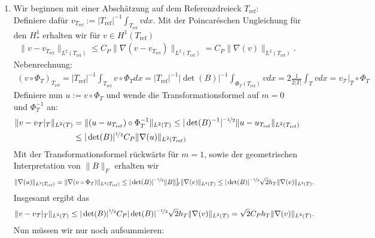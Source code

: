 \begin{solution}
\phantom{}
\begin{enumerate}[label = \textbf{\alph*)}]
  \item Wir beginnen mit einer Abschätzung auf dem Referenzdreieck $T_{\mathrm{ref}}$: \\
  Definiere dafür $v_{T_{\mathrm{ref}}} := |T_{\mathrm{ref}}|^{-1}\int_{T_{\mathrm{ref}}} v dx$.
  Mit der Poincaréschen Ungleichung für den $H_*^1$ erhalten wir für $v \in H^1(T_{\mathrm{ref}})$
  \begin{align*}
    \|v - v_{T_{\mathrm{ref}}}\|_{L^2(T_{\mathrm{ref}})} \leq
    C_P\|\nabla(v- v_{T_{\mathrm{ref}}})\|_{L^2(T_{\mathrm{ref}})}
    = C_P\|\nabla(v)\|_{L^2(T_{\mathrm{ref}})}.
  \end{align*}
  Nebenrechnung:
  \begin{align*}
    (v\circ\Phi_T)_{T_{\mathrm{ref}}} = |T_{\mathrm{ref}}|^{-1}\int_{T_{\mathrm{ref}}} v \circ \Phi_T dx
    = |T_{\mathrm{ref}}|^{-1}|\det(B)|^{-1}\int_{\Phi_T(T_{\mathrm{ref}})} v dx
    = 2 \frac{1}{2|T|}\int_{T} v dx = v_{\mathcal{T}}|_T\circ \Phi_T
  \end{align*}
  Definiere nun $u := v \circ \Phi_T$ und wende die Transformationsformel auf $m = 0$ und $\Phi_T^{-1}$ an:
  \begin{align*}
    \|v - v_{\mathcal{T}}|_T\|_{L^2(T)} &= \|(u - u_{T_{\mathrm{ref}}}) \circ \Phi_T^{-1}\|_{L^2(T)}
    \leq |\det(B)^{-1}|^{\nicefrac{-1}{2}}\|u - u_{T_{\mathrm{ref}}}\|_{L^2(T_{\mathrm{ref}})} \\
    &\leq |\det(B)|^{\nicefrac{1}{2}}C_P\|\nabla(u)\|_{L^2(T_{\mathrm{ref}})}
  \end{align*}
  Mit der Transformationsformel rückwärts für $m = 1$, sowie der geometrischen Interpretation
  von $\|B\|_F$ erhalten wir
  \begin{align*}
    \|\nabla(u)\|_{L^2(T_{\mathrm{ref}})} = \|\nabla(v \circ \Phi_T)\|_{L^2(T_{\mathrm{ref}})}
    \leq |\det(B)|^{\nicefrac{-1}{2}}\|B\|_F^1\|\nabla(v)\|_{L^2(T)}
    \leq |\det(B)|^{\nicefrac{-1}{2}}\sqrt{2}h_T\|\nabla(v)\|_{L^2(T)}.
  \end{align*}
  Insgesamt ergibt das
  \begin{align*}
    \|v - v_{\mathcal{T}}|_T\|_{L^2(T)} \leq
    |\det(B)|^{\nicefrac{1}{2}}C_P|\det(B)|^{\nicefrac{-1}{2}}\sqrt{2}h_T\|\nabla(v)\|_{L^2(T)}
    = \sqrt{2}C_Ph_T\|\nabla(v)\|_{L^2(T)}.
  \end{align*}
  Nun müssen wir nur noch aufsummieren:
  \begin{align*}

\end{align*}
\end{enumerate}
\end{solution}

